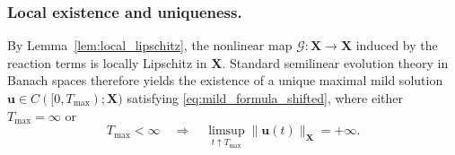 \documentclass[pdflatex,sn-mathphys-ay]{sn-jnl}
\theoremstyle{thmstyleone}
\theoremstyle{definition}
\theoremstyle{remark}
\begin{document}
\subsubsection{Local existence and uniqueness.}
By Lemma~\ref{lem:local_lipschitz}, the nonlinear map $\mathcal{G}:\mathbf{X}\to\mathbf{X}$ induced by the reaction terms
is locally Lipschitz in $\mathbf{X}$.
Standard semilinear evolution theory in Banach spaces therefore yields the existence of a unique maximal mild solution
$\mathbf{u}\in C([0,T_{\max});\mathbf{X})$ satisfying \eqref{eq:mild_formula_shifted}, where either $T_{\max}=\infty$ or
\begin{equation}
\label{eq:blowup_alternative_analysis}
T_{\max}<\infty\quad \Longrightarrow\quad
\limsup_{t\uparrow T_{\max}}\|\mathbf{u}(t)\|_{\mathbf{X}}=+\infty.
\end{equation}
\end{document}
